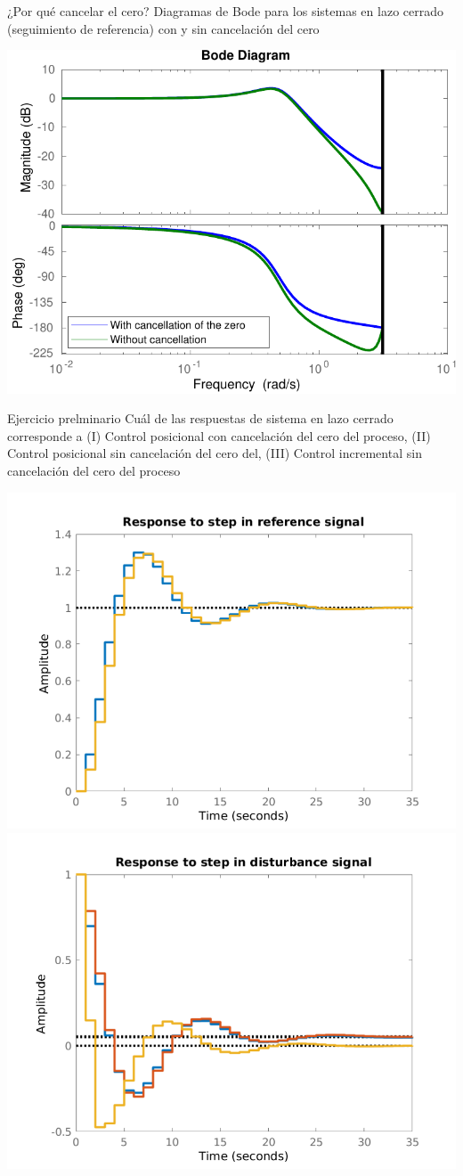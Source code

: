 \documentclass[presentation,aspectratio=169]{beamer}
\begin{document}
\begin{frame}[label={sec:org0d2bffa}]{¿Por qué cancelar el cero?}
Diagramas de Bode para los sistemas en lazo cerrado (seguimiento de referencia) con y sin cancelación del cero

\begin{center}
\includegraphics[width=0.6\linewidth]{../../figures/aw5_3_bode}
\end{center}
\end{frame}

\begin{frame}[label={sec:org55f820d}]{Ejercicio prelminario}
Cuál de las respuestas de sistema en lazo cerrado corresponde a (I) Control posicional \alert{con} cancelación del cero del proceso,  (II) Control posicional \alert{sin} cancelación del cero del, (III) Control \alert{incremental} sin cancelación del cero del proceso
\begin{center}
\includegraphics[width=0.45\linewidth]{../../figures/aw5_3_refstep}
\includegraphics[width=0.45\linewidth]{../../figures/aw5_3_diststep}
\end{center}
\end{frame}
\end{document}
